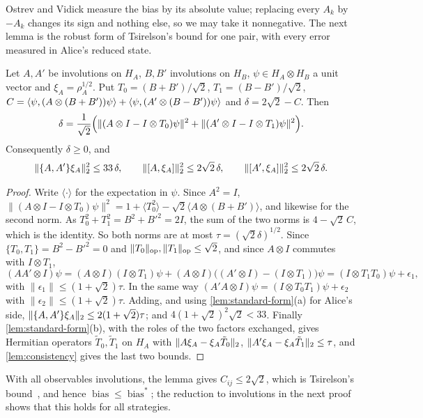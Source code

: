 Ostrev and Vidick measure the bias by its absolute value; replacing every $A_k$ by $-A_k$ changes its sign and nothing else, so we may take
it nonnegative. The next lemma is the robust form of Tsirelson's bound for one pair, with every error measured in Alice's reduced state.

\begin{lemma}\label{lem:one-pair}
Let $A,A'$ be involutions on $H_A$, $B,B'$ involutions on $H_B$, $\psi\in H_A\otimes H_B$ a unit vector and $\xi_A=\rho_A^{1/2}$. Put
$T_0=(B+B')/\sqrt2$, $T_1=(B-B')/\sqrt2$,
$C=\langle \psi,(A\otimes(B+B'))\psi\rangle+\langle \psi,(A'\otimes(B-B'))\psi\rangle$ and $\delta=2\sqrt2-C$. Then
\[
\delta=\frac1{\sqrt2}\Bigl(\lVert(A\otimes I-I\otimes T_0)\psi\rVert^2+\lVert(A'\otimes I-I\otimes T_1)\psi\rVert^2\Bigr).
\]
Consequently $\delta\ge0$, and
\[
\lVert \{A,A'\}\xi_A\rVert_2^2\le33\,\delta,\qquad\lVert [A,\xi_A]\rVert_2^2\le2\sqrt2\,\delta,\qquad\lVert [A',\xi_A]\rVert_2^2\le2\sqrt2\,\delta.
\]
\end{lemma}

\begin{proof}
Write $\langle\cdot\rangle$ for the expectation in $\psi$. Since $A^2=I$, $\lVert(A\otimes I-I\otimes T_0)\psi\rVert^2=1+\langle
T_0^2\rangle-\sqrt2\langle A\otimes(B+B')\rangle$, and likewise for the second norm. As $T_0^2+T_1^2=B^2+B'^2=2I$, the sum of the two norms
is $4-\sqrt2\,C$, which is the identity. So both norms are at most $\tau=(\sqrt2\delta)^{1/2}$. Since $\{T_0,T_1\}=B^2-B'^2=0$ and
$\lVert T_0\rVert_{\mathrm{op}},\lVert T_1\rVert_{\mathrm{op}}\le\sqrt2$, and since $A\otimes I$ commutes with $I\otimes T_1$,
\[
(AA'\otimes I)\psi=(A\otimes I)(I\otimes T_1)\psi+(A\otimes I)\bigl((A'\otimes I)-(I\otimes T_1)\bigr)\psi=(I\otimes T_1T_0)\psi+\epsilon_1,
\]
with $\lVert\epsilon_1\rVert\le(1+\sqrt2)\tau$. In the same way $(A'A\otimes I)\psi=(I\otimes T_0T_1)\psi+\epsilon_2$ with
$\lVert\epsilon_2\rVert\le(1+\sqrt2)\tau$. Adding, and using \cref{lem:standard-form}(a) for Alice's side,
$\lVert \{A,A'\}\xi_A\rVert_2\le2(1+\sqrt2)\tau$; and $4(1+\sqrt2)^2\sqrt2<33$. Finally \cref{lem:standard-form}(b), with the roles of the two
factors exchanged, gives Hermitian operators $\tilde T_0,\tilde T_1$ on $H_A$ with $\lVert A\xi_A-\xi_A\tilde T_0\rVert_2$,
$\lVert A'\xi_A-\xi_A\tilde T_1\rVert_2\le\tau$, and \cref{lem:consistency} gives the last two bounds.
\end{proof}

With all observables involutions, the lemma gives $C_{ij}\le2\sqrt2$, which is Tsirelson's bound~\cite{Cir80}, and hence
$\operatorname{bias}\le\operatorname{bias}^*$; the reduction to involutions in the next proof shows that this holds for all strategies.

